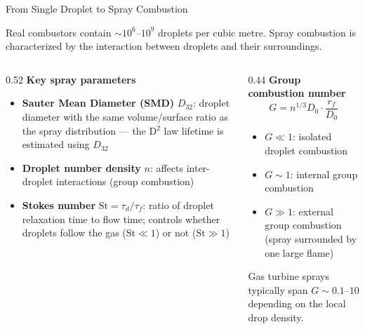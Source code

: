 \documentclass[12pt,aspectratio=169]{beamer}
\newcommand{\rf}{r_f}
\begin{document}
\begin{frame}{From Single Droplet to Spray Combustion}

  Real combustors contain $\sim 10^6$--$10^9$ droplets per
  cubic metre.
  Spray combustion is characterized by the interaction between
  droplets and their surroundings.

  \begin{columns}[t]
    \begin{column}{0.52\textwidth}
      \textbf{Key spray parameters}
      \begin{itemize}
        \item \textbf{Sauter Mean Diameter (SMD)} $D_{32}$:
              droplet diameter with the same volume/surface ratio
              as the spray distribution --- the D$^2$ law lifetime
              is estimated using $D_{32}$
        \item \textbf{Droplet number density} $n$: affects inter-
              droplet interactions (group combustion)
        \item \textbf{Stokes number} $\mathrm{St} = \tau_d/\tau_f$:
              ratio of droplet relaxation time to flow time;
              controls whether droplets follow the gas ($\mathrm{St} \ll 1$)
              or not ($\mathrm{St} \gg 1$)
      \end{itemize}
    \end{column}
    \begin{column}{0.44\textwidth}
      \textbf{Group combustion number}
      \[
        G = n^{1/3} D_0 \cdot \frac{\rf}{D_0}
      \]
      \begin{itemize}
        \item $G \ll 1$: isolated droplet combustion
        \item $G \sim 1$: internal group combustion
        \item $G \gg 1$: external group combustion
              (spray surrounded by one large flame)
      \end{itemize}
      \small Gas turbine sprays typically span
      $G \sim 0.1$--$10$ depending on the
      local drop density.
    \end{column}
  \end{columns}
\end{frame}
\end{document}
